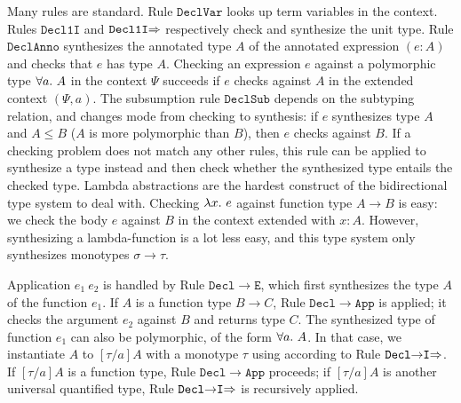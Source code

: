 Many rules are standard.
Rule $\mathtt{DeclVar}$ looks up term variables in the context.
Rules $\mathtt{Decl1I}$ and $\mathtt{Decl1I{\Rightarrow}}$ respectively check and synthesize the unit type.
Rule $\mathtt{DeclAnno}$ synthesizes the annotated type $A$ of the annotated expression $(e:A)$
and checks that $e$ has type $A$.
Checking an expression $e$ against a polymorphic type $\all A$ in the context $\Psi$ succeeds
if $e$ checks against $A$ in the extended context $(\Psi, a)$.
The subsumption rule $\mathtt{DeclSub}$ depends on the subtyping relation,
and changes mode from checking to synthesis: if $e$ synthesizes type $A$ and $A\le B$
($A$ is more polymorphic than $B$), then $e$ checks against $B$.
If a checking problem does not match any other rules,
this rule can be applied to synthesize a type instead and then
check whether the synthesized type entails the checked type.
Lambda abstractions are the hardest construct of the bidirectional
type system to deal with. 
Checking $\lam e$ against function type $A\to B$ is easy:
we check the body $e$ against $B$ in the context extended with $x:A$.
However, synthesizing a lambda-function is a lot less easy, and 
this type system only synthesizes monotypes $\sigma\to\tau$.

Application $e_1~e_2$ is handled by Rule $\mathtt{Decl{\to}E}$,
which first synthesizes the type $A$ of the function $e_1$.
If $A$ is a function type $B\to C$, Rule $\mathtt{Decl{\to}App}$ is applied;
it checks the argument $e_2$ against $B$ and returns type $C$.
The synthesized type of function $e_1$ can also be polymorphic, of the form $\all A$.
In that case, we instantiate $A$ to $[\tau/a]A$ with a monotype $\tau$ %
using according to Rule $\mathtt{Decl{\to}I{\Rightarrow}}$.
If $[\tau/a]A$ is a function type, Rule $\mathtt{Decl{\to}App}$ proceeds;
if $[\tau/a]A$ is another universal quantified type,
Rule $\mathtt{Decl{\to}I{\Rightarrow}}$ is recursively applied.

